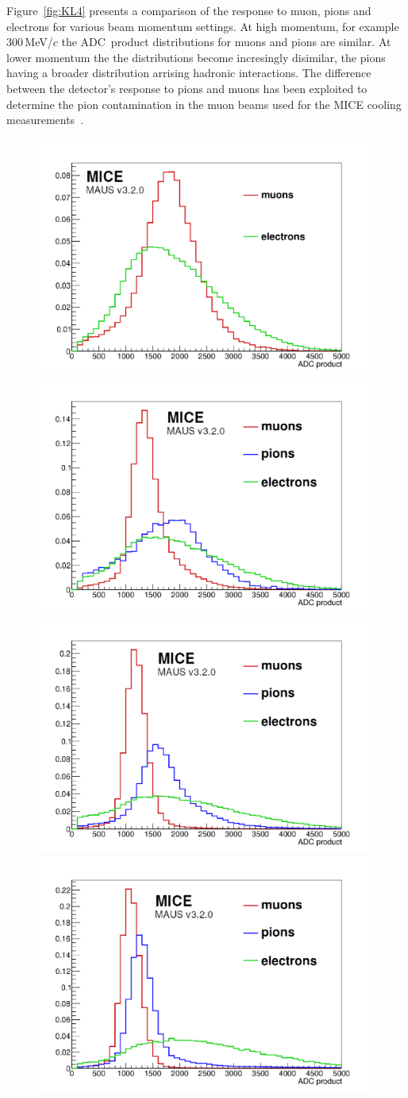 Figure~\ref{fig:KL4} presents a comparison of the response to muon,
pions and electrons for various beam momentum settings.
At high momentum, for example 300\,MeV/$c$ the ADC~product
distributions for muons and pions are similar.
At lower momentum the the distributions become incresingly disimilar,
the pions having a broader distribution arrising hadronic
interactions.
The difference between the detector's response to pions and muons has
been exploited to determine the pion contamination in the muon beams
used for the MICE cooling measurements~\cite{2016JInst..11P3001A}.  
\begin{figure}
  \begin{center}
    \includegraphics[width=0.45\columnwidth]{./04-KL/Figures/mu_vs_e_140MEV.pdf}
    \includegraphics[width=0.45\columnwidth]{./04-KL/Figures/mu_vs_pi_vs_e_170MEV.pdf} 
    \includegraphics[width=0.45\columnwidth]{./04-KL/Figures/mu_vs_pi_vs_e_200MEV.pdf}
    \includegraphics[width=0.45\columnwidth]{./04-KL/Figures/mu_vs_pi_vs_e_240MEV.pdf}  	

\end{center}
\end{figure}
